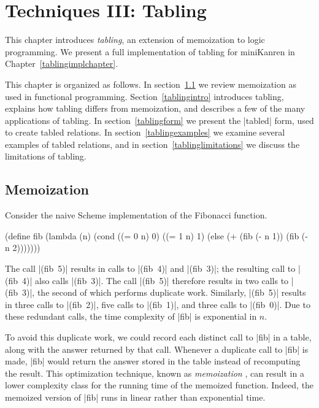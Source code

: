 \chapter{Techniques III: Tabling}\label{tablingchapter}

This chapter introduces \emph{tabling}, an extension of memoization to
logic programming.  We present a full implementation of tabling for
miniKanren in Chapter~\ref{tablingimplchapter}.

This chapter is organized as follows.  In section~\ref{tablingmemo} we
review memoization as used in functional programming.
Section~\ref{tablingintro} introduces tabling, explains how tabling
differs from memoization, and describes a few of the many applications
of tabling.  In section~\ref{tablingform} we present the
\scheme|tabled| form, used to create tabled relations.  In
section~\ref{tablingexamples} we examine several examples of tabled
relations, and in section~\ref{tablinglimitations} we discuss the
limitations of tabling.

\section{Memoization}\label{tablingmemo}

Consider the naive Scheme implementation of the Fibonacci function.

\schemedisplayspace
\begin{schemedisplay}
(define fib
  (lambda (n)
    (cond
      ((= 0 n) 0)
      ((= 1 n) 1)
      (else (+ (fib (- n 1)) (fib (- n 2)))))))
\end{schemedisplay}

\noindent 
The call \mbox{\scheme|(fib 5)|} results in calls to
\mbox{\scheme|(fib 4)|} and \mbox{\scheme|(fib 3)|}; the resulting
call to \mbox{\scheme|(fib 4)|} also calls \mbox{\scheme|(fib 3)|}.
The call \mbox{\scheme|(fib 5)|} therefore results in two calls to
\mbox{\scheme|(fib 3)|}, the second of which performs duplicate work.
Similarly, \mbox{\scheme|(fib 5)|} results in three calls to
\mbox{\scheme|(fib 2)|}, five calls to \mbox{\scheme|(fib 1)|}, and
three calls to \mbox{\scheme|(fib 0)|}.  Due to these redundant calls,
the time complexity of \scheme|fib| is exponential in $n$.

To avoid this duplicate work, we could record each distinct call to
\scheme|fib| in a table, along with the answer returned by that call.
Whenever a duplicate call to \scheme|fib| is made, \scheme|fib| would
return the answer stored in the table instead of recomputing the
result.  This optimization technique, known as \emph{memoization}
\cite{Michie68}, can result in a lower complexity class for the
running time of the memoized function.  Indeed, the memoized version
of \scheme|fib| runs in linear rather than exponential time.

